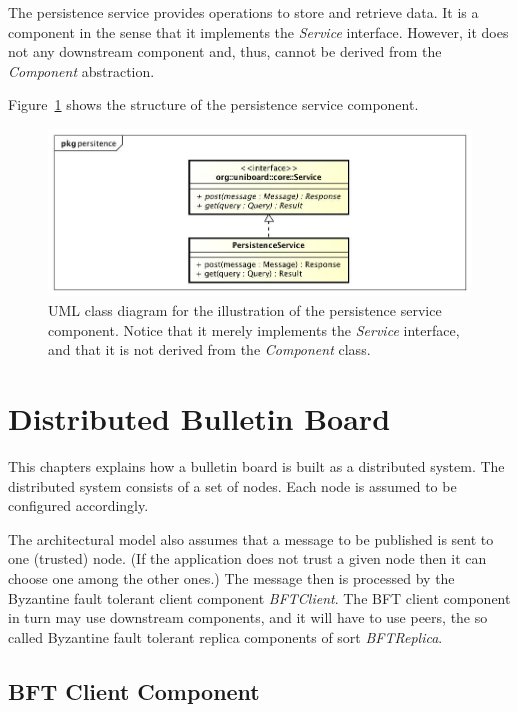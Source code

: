 \documentclass[oneside]{scrreprt}
\newcommand{\fig}[1]{Figure~\ref{#1}}
\begin{document}
The persistence service provides operations to store and
retrieve data. It is a component in the sense that it
implements the \emph{Service} interface. However, it
does not any downstream component and, thus, cannot be
derived from the \emph{Component} abstraction.

\fig{fig:persistence-service} shows the structure of the persistence service
component.

\begin{figure}[ht]
\centerline{
\includegraphics[width=1.0\textwidth]{figs/persistence-service}}
\caption{UML class diagram for the illustration of the
persistence service component. Notice that it merely implements
the \emph{Service} interface, and that it is not derived
from the \emph{Component} class.}
\label{fig:persistence-service}
\end{figure}


\chapter{Distributed Bulletin Board}

This chapters explains how a bulletin board is built as
a distributed system. The distributed system consists of
a set of nodes. Each node is assumed to be configured
accordingly.

The architectural model also assumes that a message to
be published is sent to one (trusted) node. (If the
application does not trust a given node then it can
choose one among the other ones.) The message then is
processed by the Byzantine fault tolerant client
component \emph{BFTClient}. The BFT client component in turn
may use downstream components, and it will have
to use peers, the so called Byzantine fault tolerant
replica components of sort \emph{BFTReplica}.


\section{BFT Client Component}
\end{document}
